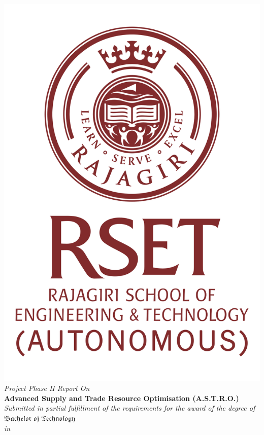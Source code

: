 \begin{center}
	\includegraphics[scale=0.35]{Figures/logo1.png}\\[0.5cm]
	\large \textit{Project Phase II Report On}\\[0.5cm]
	\Large \textbf{Advanced Supply and Trade Resource Optimisation (A.S.T.R.O.)}\\[0.5cm]
	\textit{Submitted in partial fulfillment of the
		requirements for the award of the degree of}\\[0.5cm]
	{\huge {$\mathfrak {Bachelor\; of\; Technology}$}}\\[.5cm]
	\textit{in}\\[.5cm]

\end{center}
